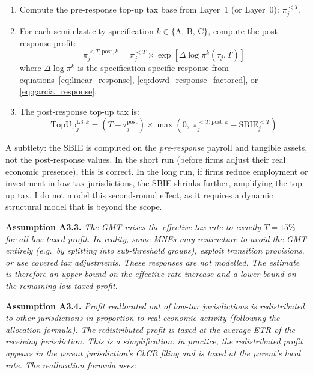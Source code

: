 \documentclass[11pt,a4paper]{article}
\newcommand{\assumption}[2]{\noindent\textbf{Assumption #1.} \textit{#2}\medskip}
\begin{document}
\begin{enumerate}
\item Compute the pre-response top-up tax base from Layer~1 (or Layer~0): $\pi_j^{<T}$.
\item For each semi-elasticity specification $k \in \{\text{A, B, C}\}$, compute the post-response profit:
\begin{equation}\label{eq:post_response}
\pi_j^{<T,\text{post},k} = \pi_j^{<T} \times \exp\!\left[\Delta\log\pi^k(\tau_j, T)\right]
\end{equation}
where $\Delta\log\pi^k$ is the specification-specific response from equations~\eqref{eq:linear_response}, \eqref{eq:dowd_response_factored}, or \eqref{eq:garcia_response}.
\item The post-response top-up tax is:
\begin{equation}\label{eq:topup_post}
\text{TopUp}_j^{\text{L3},k} = (T - \tau_j^{\text{post}}) \times \max\!\left(0,\; \pi_j^{<T,\text{post},k} - \text{SBIE}_j^{<T}\right)
\end{equation}
\end{enumerate}

A subtlety: the SBIE is computed on the \emph{pre-response} payroll and tangible assets, not the post-response values. In the short run (before firms adjust their real economic presence), this is correct. In the long run, if firms reduce employment or investment in low-tax jurisdictions, the SBIE shrinks further, amplifying the top-up tax. I do not model this second-round effect, as it requires a dynamic structural model that is beyond the scope.

\assumption{A3.3}{The GMT raises the effective tax rate to exactly $T = 15\%$ for all low-taxed profit. In reality, some MNEs may restructure to avoid the GMT entirely (e.g.\ by splitting into sub-threshold groups), exploit transition provisions, or use covered tax adjustments. These responses are not modelled. The estimate is therefore an upper bound on the effective rate increase and a lower bound on the remaining low-taxed profit.}

\assumption{A3.4}{Profit reallocated out of low-tax jurisdictions is redistributed to other jurisdictions in proportion to real economic activity (following the \citet{garcia2024} allocation formula). The redistributed profit is taxed at the average ETR of the receiving jurisdiction. This is a simplification: in practice, the redistributed profit appears in the parent jurisdiction's CbCR filing and is taxed at the parent's local rate. The reallocation formula uses:}
\end{document}
